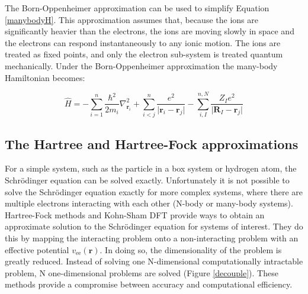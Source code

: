 The Born-Oppenheimer approximation can be used to simplify Equation \ref{manybodyH}. This approximation assumes that, because the ions are significantly heavier than the electrons, the ions are moving slowly in space and the electrons can respond instantaneously to any ionic motion. The ions are treated as fixed points, and only the electron sub-system is treated quantum mechanically. 
Under the Born-Oppenheimer approximation the many-body Hamiltonian becomes:

\begin{equation}
\hat{H} = -\sum_{i=1}^n\frac{\hbar^2}{2m_i}\nabla_{\textbf{r}_i}^2 +\sum_{i<j}^n\frac{e^2}{\lvert\textbf{r}_i-\textbf{r}_j\rvert}-\sum_{i,I}^{n,N}\frac{Z_Ie^2}{\lvert\textbf{R}_I-\textbf{r}_j\rvert}
\end{equation}

\subsection{The Hartree and Hartree-Fock approximations}

For a simple system, such as the particle in a box system or hydrogen atom, the Schr\"{o}dinger equation can be solved exactly. Unfortunately it is not possible to solve the Schr\"{o}dinger equation exactly for more complex systems, where there are multiple electrons interacting with each other (N-body or many-body systems). 
Hartree-Fock methods and Kohn-Sham DFT provide ways to obtain an approximate solution to the Schr\"{o}dinger equation for systems of interest. They do this by mapping the interacting problem onto a non-interacting problem with an effective potential $v_\textrm{ee}(\textbf{r})$. In doing so, the dimensionality of the problem is greatly reduced. Instead of solving one N-dimensional computationally intractable problem, N one-dimensional problems are solved (Figure \ref{decouple}). These methods provide a compromise between accuracy and computational efficiency.

